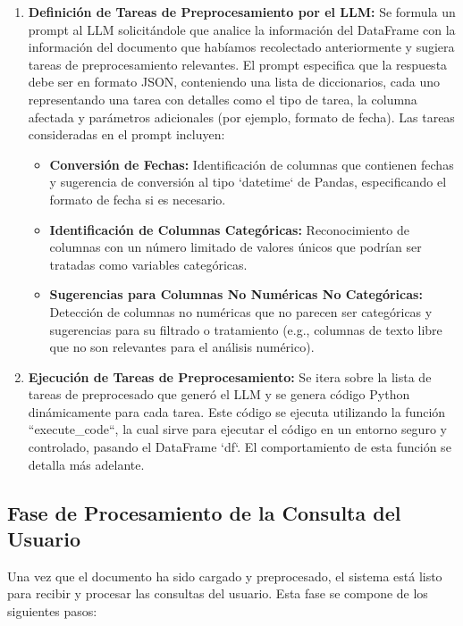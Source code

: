 \begin{enumerate}
	\item \textbf{Definición de Tareas de Preprocesamiento por el LLM:} Se formula un prompt al LLM solicitándole que analice la información del DataFrame con la información del documento que habíamos recolectado anteriormente y sugiera tareas de preprocesamiento relevantes.  El prompt especifica que la respuesta debe ser en formato JSON,  conteniendo una lista de diccionarios, cada uno representando una tarea con detalles como el tipo de tarea, la columna afectada y parámetros adicionales (por ejemplo, formato de fecha).  Las tareas consideradas en el prompt incluyen:
	\begin{itemize}
		\item \textbf{Conversión de Fechas:}  Identificación de columnas que contienen fechas y sugerencia de conversión al tipo `datetime` de Pandas, especificando el formato de fecha si es necesario.
		\item \textbf{Identificación de Columnas Categóricas:}  Reconocimiento de columnas con un número limitado de valores únicos que podrían ser tratadas como variables categóricas.
		\item \textbf{Sugerencias para Columnas No Numéricas No Categóricas:}  Detección de columnas no numéricas que no parecen ser categóricas y sugerencias para su filtrado o tratamiento (e.g., columnas de texto libre que no son relevantes para el análisis numérico).
	\end{itemize}
	
	\item \textbf{Ejecución de Tareas de Preprocesamiento:}  Se itera sobre la lista de tareas de preprocesado que generó el LLM y se genera código Python dinámicamente para cada tarea.  Este código se ejecuta utilizando la función ``execute\_code``, la cual sirve para ejecutar el código en un entorno seguro y controlado, pasando el DataFrame `df`. El comportamiento de esta función se detalla más adelante.
\end{enumerate}

\subsection{Fase de Procesamiento de la Consulta del Usuario}

Una vez que el documento ha sido cargado y preprocesado, el sistema está listo para recibir y procesar las consultas del usuario. Esta fase se compone de los siguientes pasos:

